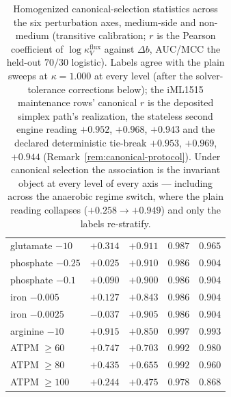 \documentclass[11pt,a4paper]{article}
\theoremstyle{plain}
\theoremstyle{definition}
\theoremstyle{remark}
\begin{document}
\begin{table}[t]
\begin{tabular}{lcccc}
glutamate $-10$ & $+0.314$ & $+0.911$ & $0.987$ & $0.965$ \\
phosphate $-0.25$ & $+0.025$ & $+0.910$ & $0.986$ & $0.904$ \\
phosphate $-0.1$ & $+0.090$ & $+0.900$ & $0.986$ & $0.904$ \\
iron $-0.005$ & $+0.127$ & $+0.843$ & $0.986$ & $0.904$ \\
iron $-0.0025$ & $-0.037$ & $+0.905$ & $0.986$ & $0.904$ \\
arginine $-10$ & $+0.915$ & $+0.850$ & $0.997$ & $0.993$ \\
ATPM $\ge 60$ & $+0.747$ & $+0.703$ & $0.992$ & $0.980$ \\
ATPM $\ge 80$ & $+0.435$ & $+0.655$ & $0.992$ & $0.960$ \\
ATPM $\ge 100$ & $+0.244$ & $+0.475$ & $0.978$ & $0.868$ \\
\hline
\end{tabular}
\caption{Homogenized canonical-selection statistics across the six
perturbation axes, medium-side and non-medium (transitive
calibration; $r$ is the Pearson
coefficient of $\log\kappa^{\mathrm{flux}}_V$ against $\Delta b$,
AUC/MCC the held-out $70/30$ logistic). Labels agree with the plain
sweeps at $\kappa=1.000$ at every level (after the
solver-tolerance corrections below); the iML1515 maintenance rows'
canonical $r$ is the deposited simplex path's realization, the
stateless second engine reading $+0.952$, $+0.968$, $+0.943$ and
the declared deterministic tie-break $+0.953$, $+0.969$, $+0.944$
(Remark~\ref{rem:canonical-protocol}). Under canonical selection the
association is the invariant object at every level of every axis ---
including across the anaerobic regime switch, where the plain
reading collapses ($+0.258 \to +0.949$) and only the labels
re-stratify.}
\label{tab:canonical-selection}
\end{table}
\end{document}
